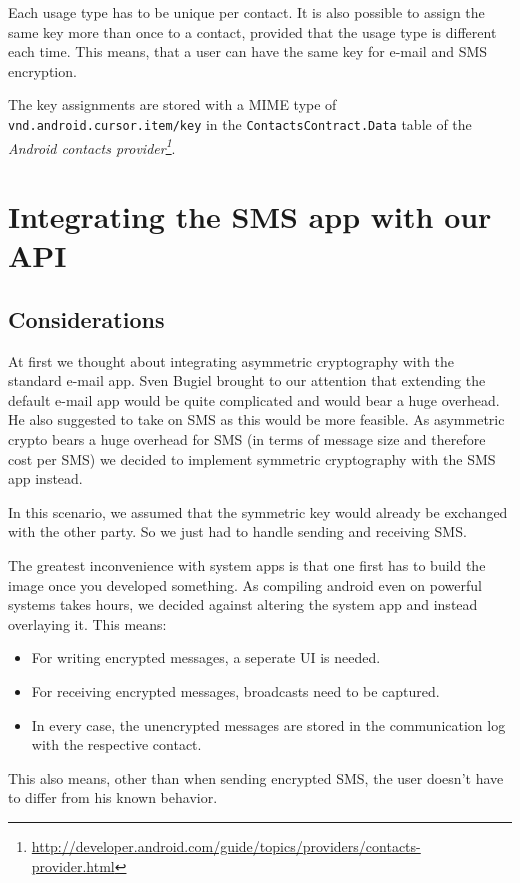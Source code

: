 \documentclass[a4paper,draft]{scrartcl}
\begin{document}
		Each usage type has to be unique per contact. It is also possible to assign the same key more than once to a contact, provided that the usage type is different each time. This means, that a user can have the same key for e-mail and SMS encryption.

		The key assignments are stored with a MIME type of \texttt{vnd.android.cursor.item/key} in the \texttt{ContactsContract.Data} table of the {\em Android contacts provider\footnote{\url{http://developer.android.com/guide/topics/providers/contacts-provider.html}}}.
		
\section{Integrating the SMS app with our API}
	\label{sec-sms-app}
	
	\subsection{Considerations}
		At first we thought about integrating asymmetric cryptography with the standard e-mail app. Sven Bugiel brought to our attention that extending the default e-mail app would be quite complicated and would bear a huge overhead. He also suggested to take on SMS as this would be more feasible. As asymmetric crypto bears a huge overhead for SMS (in terms of message size and therefore cost per SMS) we decided to implement symmetric cryptography with the SMS app instead. %
	
		In this scenario, we assumed that the symmetric key would already be exchanged with the other party. So we just had to handle sending and receiving SMS.
	
		The greatest inconvenience with system apps is that one first has to build the image once you developed something. As compiling android even on powerful systems takes hours, we decided against altering the system app and instead overlaying it. This means:
		\begin{itemize}
			\item For writing encrypted messages, a seperate UI is needed.
			\item For receiving encrypted messages, broadcasts need to be captured.
			\item In every case, the unencrypted messages are stored in the communication log with the respective contact.
		\end{itemize}
		This also means, other than when sending encrypted SMS, the user doesn't have to differ from his known behavior.
		
\end{document}
